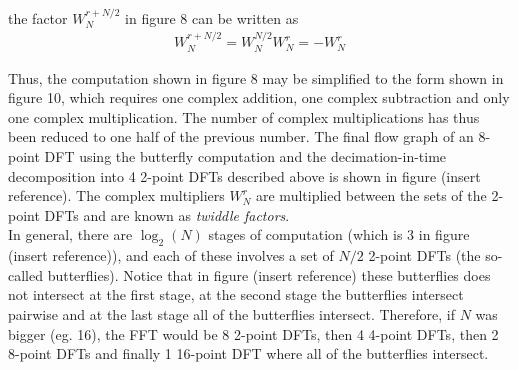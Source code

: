 the factor $W_N^{r+N/2}$ in figure 8 can be written as
\begin{align*}
W_N^{r+N/2} = W_N^{N/2} W_N^r = -W_N^r
\end{align*}

Thus, the computation shown in figure 8 may be simplified to the form shown in figure 10, which requires one complex addition, one complex subtraction and only one complex multiplication. The number of complex multiplications has thus been reduced to one half of the previous number. The final flow graph of an 8-point DFT using the butterfly computation and the decimation-in-time decomposition into 4 2-point DFTs described above is shown in figure (insert reference). The complex multipliers $W_N^r$ are multiplied between the sets of the 2-point DFTs and are known as \textit{twiddle factors}.
\\
In general, there are $\log_2(N)$ stages of computation (which is 3 in figure (insert reference)), and each of these involves a set of $N/2$ 2-point DFTs (the so-called butterflies). Notice that in figure (insert reference) these butterflies does not intersect at the first stage, at the second stage the butterflies intersect pairwise and at the last stage all of the butterflies intersect. Therefore, if $N$ was bigger (eg. 16), the FFT would be 8 2-point DFTs, then 4 4-point DFTs, then 2 8-point DFTs and finally 1 16-point DFT where all of the butterflies intersect. 